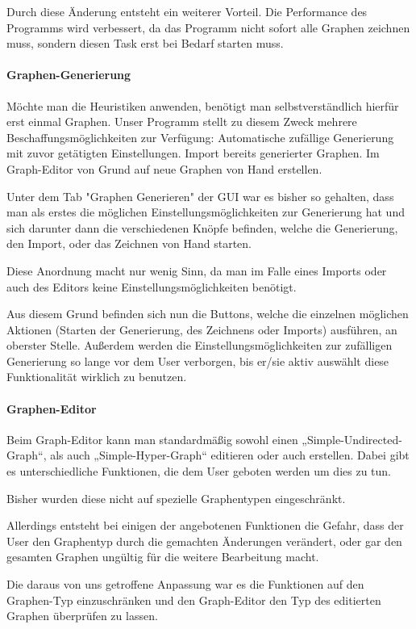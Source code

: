 				Durch diese Änderung entsteht ein weiterer Vorteil.
				Die Performance des Programms wird verbessert, da das Programm nicht sofort alle Graphen zeichnen muss, sondern diesen Task erst bei Bedarf starten muss.
			
		
		\paragraph{Graphen-Generierung}
			Möchte man die Heuristiken anwenden, benötigt man selbstverständlich hierfür erst einmal Graphen.
			Unser Programm stellt zu diesem Zweck mehrere Beschaffungsmöglichkeiten zur Verfügung:
				Automatische zufällige Generierung mit zuvor getätigten Einstellungen.
				Import bereits generierter Graphen.
				Im Graph-Editor von Grund auf neue Graphen von Hand erstellen.
			
			Unter dem Tab "Graphen Generieren" der GUI war es bisher so gehalten, dass man als erstes die möglichen Einstellungsmöglichkeiten zur Generierung hat und sich darunter dann die verschiedenen Knöpfe befinden, welche die Generierung, den Import, oder das Zeichnen von Hand starten.
			
			Diese Anordnung macht nur wenig Sinn, da man im Falle eines Imports oder auch des Editors keine Einstellungsmöglichkeiten benötigt.
			
			Aus diesem Grund befinden sich nun die Buttons, welche die einzelnen möglichen Aktionen (Starten der Generierung, des Zeichnens oder Imports) ausführen, an oberster Stelle.
			Außerdem werden die Einstellungsmöglichkeiten zur zufälligen Generierung so lange vor dem User verborgen, bis er/sie aktiv auswählt diese Funktionalität wirklich zu benutzen.
		
	
		\paragraph{Graphen-Editor}
			Beim Graph-Editor kann man standardmäßig sowohl einen „Simple-Undirected-Graph“, als auch „Simple-Hyper-Graph“ editieren oder auch erstellen.
			Dabei gibt es unterschiedliche Funktionen, die dem User geboten werden um dies zu tun.
			
			Bisher wurden diese nicht auf spezielle Graphentypen eingeschränkt.
			
			Allerdings entsteht bei einigen der angebotenen Funktionen die Gefahr, dass der User den Graphentyp durch die gemachten Änderungen verändert, oder gar den gesamten Graphen ungültig für die weitere Bearbeitung macht.
			
			Die daraus von uns getroffene Anpassung war es die Funktionen auf den Graphen-Typ einzuschränken und den Graph-Editor den Typ des editierten Graphen überprüfen zu lassen.
		
